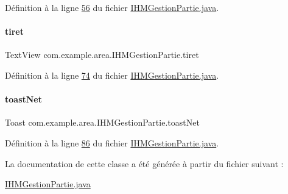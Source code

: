 Définition à la ligne \hyperlink{_i_h_m_gestion_partie_8java_source_l00056}{56} du fichier \hyperlink{_i_h_m_gestion_partie_8java_source}{I\+H\+M\+Gestion\+Partie.\+java}.

\mbox{\label{classcom_1_1example_1_1area_1_1_i_h_m_gestion_partie_a84e6684857fc76364978fff7bfbc4e00}} 
\paragraph{\texorpdfstring{tiret}{tiret}}
{\footnotesize\ttfamily Text\+View com.\+example.\+area.\+I\+H\+M\+Gestion\+Partie.\+tiret\hspace{0.3cm}{\ttfamily [private]}}



Définition à la ligne \hyperlink{_i_h_m_gestion_partie_8java_source_l00074}{74} du fichier \hyperlink{_i_h_m_gestion_partie_8java_source}{I\+H\+M\+Gestion\+Partie.\+java}.

\mbox{\label{classcom_1_1example_1_1area_1_1_i_h_m_gestion_partie_a490bd4b5241dfe6a5e709209a939fa2e}} 
\paragraph{\texorpdfstring{toast\+Net}{toastNet}}
{\footnotesize\ttfamily Toast com.\+example.\+area.\+I\+H\+M\+Gestion\+Partie.\+toast\+Net\hspace{0.3cm}{\ttfamily [private]}}



Définition à la ligne \hyperlink{_i_h_m_gestion_partie_8java_source_l00086}{86} du fichier \hyperlink{_i_h_m_gestion_partie_8java_source}{I\+H\+M\+Gestion\+Partie.\+java}.



La documentation de cette classe a été générée à partir du fichier suivant \+:\begin{DoxyCompactItemize}
\item 
\hyperlink{_i_h_m_gestion_partie_8java}{I\+H\+M\+Gestion\+Partie.\+java}\end{DoxyCompactItemize}
